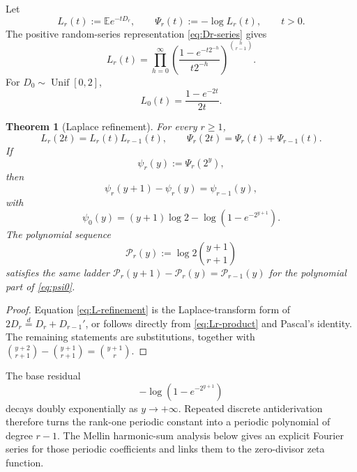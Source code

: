 \documentclass[11pt,a4paper]{article}
\theoremstyle{frontier}
\newtheorem{theorem}{Theorem}[section]
\theoremstyle{definition}
\newcommand{\E}{\mathbb E}
\begin{document}
Let
\begin{equation}\label{eq:Lr-Psir}
  L_r(t):=\E e^{-tD_r},
  \qquad
  \Psi_r(t):=-\log L_r(t),
  \qquad t>0.
\end{equation}
The positive random-series representation \eqref{eq:Dr-series} gives
\begin{equation}\label{eq:Lr-product}
 L_r(t)=\prod_{h=0}^{\infty}
 \left(\frac{1-e^{-t2^{-h}}}{t2^{-h}}\right)^{\binom h{r-1}}.
\end{equation}
For $D_0\sim\operatorname{Unif}[0,2]$,
\begin{equation}\label{eq:L0}
  L_0(t)=\frac{1-e^{-2t}}{2t}.
\end{equation}

\begin{theorem}[Laplace refinement]\label{thm:laplace-refinement}
For every $r\ge1$,
\begin{equation}\label{eq:L-refinement}
  L_r(2t)=L_r(t)L_{r-1}(t),
  \qquad
  \Psi_r(2t)=\Psi_r(t)+\Psi_{r-1}(t).
\end{equation}
If
\begin{equation}\label{eq:psi-r}
  \psi_r(y):=\Psi_r(2^y),
\end{equation}
then
\begin{equation}\label{eq:discrete-antiderivative}
  \psi_r(y+1)-\psi_r(y)=\psi_{r-1}(y),
\end{equation}
with
\begin{equation}\label{eq:psi0}
  \psi_0(y)=(y+1)\log2-\log(1-e^{-2^{y+1}}).
\end{equation}
The polynomial sequence
\begin{equation}\label{eq:Pr-polynomial}
  \mathscr P_r(y):=\log2\binom{y+1}{r+1}
\end{equation}
satisfies the same ladder
$\mathscr P_r(y+1)-\mathscr P_r(y)=\mathscr P_{r-1}(y)$ for the polynomial part of \eqref{eq:psi0}.
\end{theorem}

\begin{proof}
Equation \eqref{eq:L-refinement} is the Laplace-transform form of
$2D_r\stackrel d=D_r+D_{r-1}'$, or follows directly from \eqref{eq:Lr-product} and Pascal's identity.  The remaining statements are substitutions, together with
$\binom{y+2}{r+1}-\binom{y+1}{r+1}=\binom{y+1}{r}$.
\end{proof}

The base residual
\[
  -\log(1-e^{-2^{y+1}})
\]
decays doubly exponentially as $y\to+\infty$.  Repeated discrete antiderivation therefore turns the rank-one periodic constant into a periodic polynomial of degree $r-1$.  The Mellin harmonic-sum analysis \cite{flajolet-mellin} below gives an explicit Fourier series for those periodic coefficients and links them to the zero-divisor zeta function.
\end{document}
